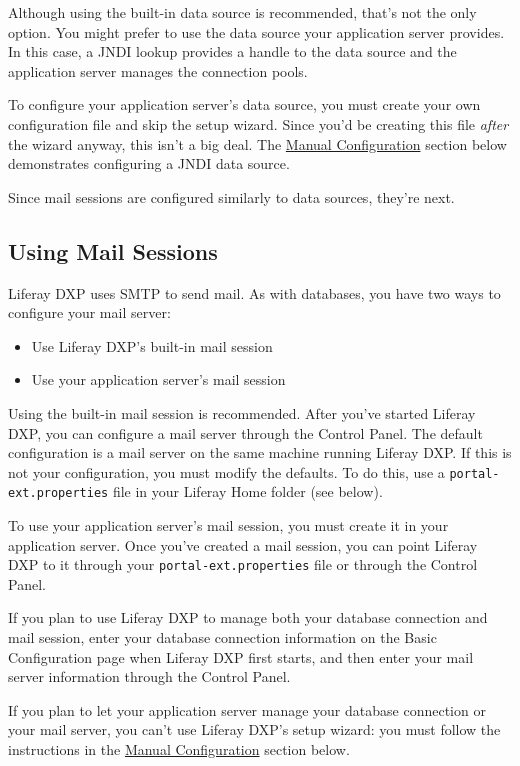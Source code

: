 Although using the built-in data source is recommended, that's not the
only option. You might prefer to use the data source your application
server provides. In this case, a JNDI lookup provides a handle to the
data source and the application server manages the connection pools.

To configure your application server's data source, you must create your
own configuration file and skip the setup wizard. Since you'd be
creating this file \emph{after} the wizard anyway, this isn't a big
deal. The \hyperref[manual-configuration]{Manual Configuration} section
below demonstrates configuring a JNDI data source.

Since mail sessions are configured similarly to data sources, they're
next.

\subsection{Using Mail Sessions}\label{using-mail-sessions}

Liferay DXP uses SMTP to send mail. As with databases, you have two ways
to configure your mail server:

\begin{itemize}
\tightlist
\item
  Use Liferay DXP's built-in mail session
\item
  Use your application server's mail session
\end{itemize}

Using the built-in mail session is recommended. After you've started
Liferay DXP, you can configure a mail server through the Control Panel.
The default configuration is a mail server on the same machine running
Liferay DXP. If this is not your configuration, you must modify the
defaults. To do this, use a \texttt{portal-ext.properties} file in your
Liferay Home folder (see below).

To use your application server's mail session, you must create it in
your application server. Once you've created a mail session, you can
point Liferay DXP to it through your \texttt{portal-ext.properties} file
or through the Control Panel.

If you plan to use Liferay DXP to manage both your database connection
and mail session, enter your database connection information on the
Basic Configuration page when Liferay DXP first starts, and then enter
your mail server information through the Control Panel.

If you plan to let your application server manage your database
connection or your mail server, you can't use Liferay DXP's setup
wizard: you must follow the instructions in the
\hyperref[manual-configuration]{Manual Configuration} section below.

